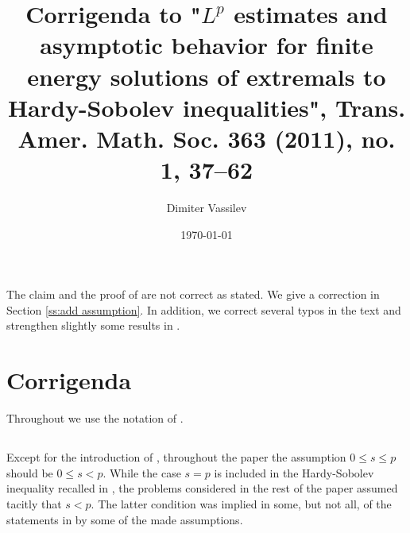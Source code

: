 \documentclass[10pt]{amsart}
\begin{document}
\newcommand{\vx}{\boldsymbol x}
\newcommand{\vy}{\boldsymbol y}
\newcommand{\vz}{\boldsymbol z}
\newcommand{\tphi}{\tilde\phi}
\newcommand{\dx}[1]{\frac {\partial {#1}} {\partial x} }
\newcommand{\dxi}[1]{\frac {\partial {#1}} {\partial \xi} }
\newcommand{\dy}[1]{\frac {\partial {#1}} {\partial y} }
\newcommand{\deta}[1]{\frac {\partial {#1}} {\partial \eta} }

\newcommand{\dmu}[1]{\frac {dz} {\abs x^{#1}} }
\newcommand{\dmus}{\frac {dz} {\abs x^{s}} }

\newcommand{\ueps}{{u_\epsilon}}
\newcommand{\veps}{{v_\epsilon}}
\newcommand{\bueps}{{{\bar u}_\epsilon}}


\title[Corrigenda to "Hardy-Sobolev inequalities.."]{Corrigenda to "$L^p$ estimates and asymptotic behavior for finite energy solutions of extremals
 to Hardy-Sobolev inequalities", Trans. Amer. Math. Soc. 363 (2011), no. 1, 37--62}
 
\date{\today}

\author{Dimiter Vassilev}
\address[Dimiter Vassilev]{ Department of Mathematics and Statistics\\ University of New Mexico\\
Albuquerque, New Mexico, 87131}



\maketitle



The  claim and the proof of \cite[Theorem 2.9]{V11} are not correct as stated. We give a  correction in Section \ref{ss:add assumption}. In addition, we correct several typos in the text and strengthen  slightly some results in \cite{V11}.


\section{Corrigenda} Throughout we use the notation of \cite{V11}.

\subsection{}  Except for the  introduction of \cite{V11}, throughout the paper the assumption $0\leq s\leq p$ should be $0\leq s<p$. While the case $s=p$ is included in the Hardy-Sobolev inequality recalled in \cite[Theorem 1.1]{V11}, the problems considered in the rest of the paper assumed tacitly that $s<p$. The latter condition was implied in some, but not all, of the statements in \cite{V11} by some of the made assumptions. 
\end{document}
